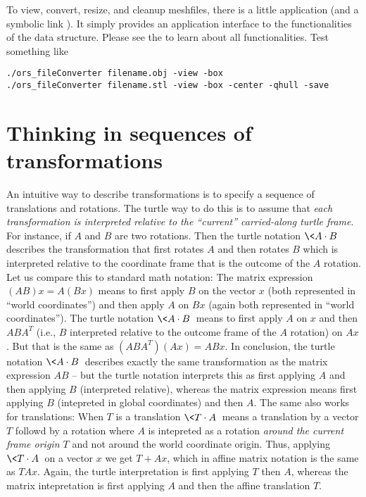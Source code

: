 To view, convert, resize, and cleanup meshfiles, there is a little
application  (and a symbolic
link ). It simply provides an
application interface to the functionalities of the  data
structure. Please see the  to
learn about all functionalities. Test something like
\begin{code}
\begin{verbatim}
./ors_fileConverter filename.obj -view -box
./ors_fileConverter filename.stl -view -box -center -qhull -save
\end{verbatim}
\end{code}



\appendix

\section{Thinking in sequences of transformations}

An intuitive way to describe transformations is to specify a sequence
of translations and rotations. The turtle way to do this is to assume
that \emph{each transformation is interpreted relative to the
  ``current'' carried-along turtle frame}. For instance, if $A$ and
$B$ are two rotations. Then the turtle notation $\< A \cdot B \>$
describes the transformation that first rotates $A$ and then rotates
$B$ which is interpreted relative to the coordinate frame that is the
outcome of the $A$ rotation. Let us compare this to standard math
notation: The matrix expression $(A B) x = A (B x)$ means to first
apply $B$ on the vector $x$ (both represented in ``world
coordinates'') and then apply $A$ on $Bx$ (again both represented in
``world coordinates'').  The turtle notation $\<A \cdot B\>$ means to
first apply $A$ on $x$ and then $A B A^T$ (i.e., $B$ interpreted
relative to the outcome frame of the $A$ rotation) on $A x$. But that
is the same as $(A B A^T) (A x) = ABx$. In conclusion, the turtle
notation $\<A \cdot B\>$ describes exactly the same transformation as
the matrix expression $A B$ -- but the turtle notation interprets this
as first applying $A$ and then applying $B$ (interpreted relative),
whereas the matrix expression means first applying $B$ (intepreted in
global coordinates) and then $A$. The same also works for
translations: When $T$ is a translation $\<T \cdot A\>$ means a
translation by a vector $T$ followd by a rotation where $A$ is
intepreted as a rotation \emph{around the current frame origin $T$}
and not around the world coordinate origin. Thus, applying $\<T \cdot
A\>$ on a vector $x$ we get $T + A x$, which in affine matrix notation
is the same as $T A x$. Again, the turtle interpretation is first
applying $T$ then $A$, whereas the matrix intepretation is first
applying $A$ and then the affine translation $T$.

